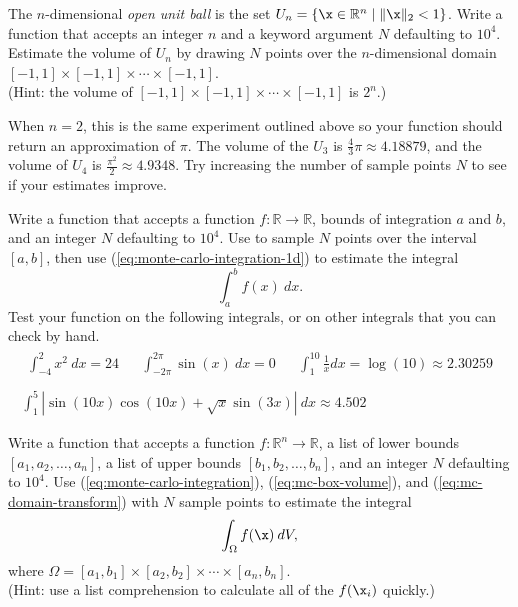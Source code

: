 
The $n$-dimensional \emph{open unit ball} is the set $U_n = \{\x\in\mathbb{R}^n\mid \|\x\|_2 < 1\}$.
Write a function that accepts an integer $n$ and a keyword argument $N$ defaulting to $10^4$.
Estimate the volume of $U_n$ by drawing $N$ points over the $n$-dimensional domain $[-1,1]\times[-1,1]\times\cdots\times[-1,1]$.
\\(Hint: the volume of $[-1,1]\times[-1,1]\times\cdots\times[-1,1]$ is $2^n$.)

When $n=2$, this is the same experiment outlined above so your function should return an approximation of $\pi$.
The volume of the $U_3$ is $\frac{4}{3}\pi \approx 4.18879$, and the volume of $U_4$ is $\frac{\pi^2}{2} \approx 4.9348$.
Try increasing the number of sample points $N$ to see if your estimates improve.
\label{prob:unit-ball-volume}

Write a function that accepts a function $f:\mathbb{R}\rightarrow\mathbb{R}$, bounds of integration $a$ and $b$, and an integer $N$ defaulting to $10^4$.
Use  to sample $N$ points over the interval $[a,b]$, then use (\ref{eq:monte-carlo-integration-1d}) to estimate the integral
\[
\int_a^b f(x)\:dx.
\]
Test your function on the following integrals, or on other integrals that you can check by hand.
\[
\begin{array}{c}
    \begin{array}{ccccc}
    \displaystyle\int_{-4}^2 x^2\:dx = 24
    & &
    \displaystyle\int_{-2\pi}^{2\pi} \sin(x)\:dx = 0
    & &
    \displaystyle\int_1^{10} \frac{1}{x}dx = \log(10) \approx 2.30259
    \end{array}
\\ \\
\displaystyle\int_1^5 \left|\sin(10x)\cos(10x) + \sqrt{x}\sin(3x) \right|\:dx \approx 4.502
\end{array}
\]
\label{prob:monte-carlo-integration-1d}

Write a function that accepts a function $f:\mathbb{R}^n\rightarrow\mathbb{R}$, a list of lower bounds $[a_1, a_2, \ldots, a_n]$, a list of upper bounds $[b_1, b_2, \ldots, b_n]$, and an integer $N$ defaulting to $10^4$.
Use (\ref{eq:monte-carlo-integration}), (\ref{eq:mc-box-volume}), and (\ref{eq:mc-domain-transform}) with $N$ sample points to estimate the integral
\[
\int_\Omega f(\x)\:dV,
\]
where $\Omega = [a_1,b_1]\times[a_2,b_2]\times\cdots\times[a_n,b_n]$.
\\(Hint: use a list comprehension to calculate all of the $f(\x_i)$ quickly.)

